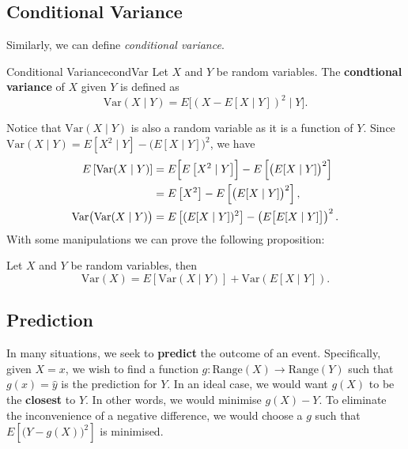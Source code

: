 \documentclass[math]{amznotes}
\theoremstyle{remark}
\begin{document}
\subsection{Conditional Variance}
Similarly, we can define \textit{conditional variance}.
\begin{dfnbox}{Conditional Variance}{condVar}
    Let $X$ and $Y$ be random variables. The {\color{red} \textbf{condtional variance}} of $X$ given $Y$ is defined as
    \begin{equation*}
        \mathrm{Var}(X \mid Y) = E\bigl[(X - E[X \mid Y])^2 \mid Y\bigr].
    \end{equation*}
\end{dfnbox}
Notice that $\mathrm{Var}(X \mid Y)$ is also a random variable as it is a function of $Y$. Since $\mathrm{Var}(X \mid Y) = E\left[X^2 \mid Y\right] - \bigl(E[X \mid Y]\bigr)^2$, we have
\begin{align*}
    E\left[\mathrm{Var}(X \mid Y)\right] & = E\Bigl[E\left[X^2 \mid Y\right]\Bigr] - E\left[\bigl(E[X \mid Y]\bigr)^2\right] \\
    & = E\left[X^2\right] - E\left[\bigl(E[X \mid Y]\bigr)^2\right], \\
    \mathrm{Var}\bigl(\mathrm{Var}(X \mid Y)\bigr) & = E\left[(E[X \mid Y])^2\right] - \left(E\bigl[E[X \mid Y]\bigr]\right)^2.
\end{align*}
With some manipulations we can prove the following proposition:
\begin{probox}{}{}
    Let $X$ and $Y$ be random variables, then
    \begin{equation*}
        \mathrm{Var}(X) = E[\mathrm{Var}(X \mid Y)] + \mathrm{Var}(E[X \mid Y]).
    \end{equation*}
\end{probox}
\subsection{Prediction}
In many situations, we seek to \textbf{predict} the outcome of an event. Specifically, given $X = x$, we wish to find a function $g \colon \mathrm{Range}(X) \to \mathrm{Range}(Y)$ such that $g(x) = \hat{y}$ is the prediction for $Y$. In an ideal case, we would want $g(X)$ to be the \textbf{closest} to $Y$. In other words, we would minimise $g(X) - Y$. To eliminate the inconvenience of a negative difference, we would choose a $g$ such that $E\left[\bigl(Y - g(X)\bigr)^2\right]$ is minimised.
\end{document}
